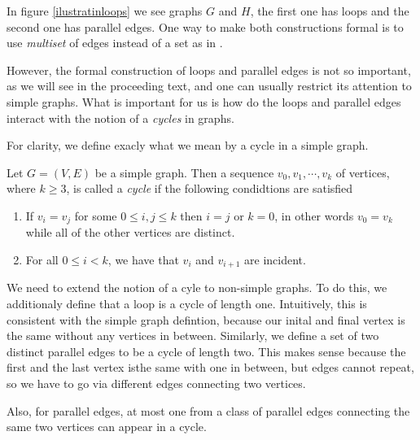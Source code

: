 In figure \ref{ilustratinloops} we see graphs $G$ and $H$, the first one has loops and the second one has parallel edges. One way to make both constructions formal is to use \textit{multiset} of edges instead of a set as in \cite[4]{oxley1}.

However, the formal construction of loops and parallel edges is not so important, as we will see in the proceeding text, and one can usually restrict its attention to simple graphs. What is important for us is how do the loops and parallel edges interact with the notion of a \textit{cycles} in graphs. 

For clarity, we define exacly what we mean by a cycle in a simple graph.

\begin{defn}
    Let $G = (V,E)$ be a simple graph. Then a sequence $v_0, v_1, \cdots, v_k$ of vertices, where $k\geq 3$, is called a \textit{cycle} if the following condidtions are satisfied
    
    \begin{enumerate}

        \item If $v_i = v_j$ for some $0 \leq i,j \leq k$ then $i = j$ or $k = 0$, in other words $v_0 = v_k$ while all of the other vertices are distinct. 
        
        \item For all $0\leq i < k$, we have that $v_i$ and $v_{i+1}$ are incident.
    \end{enumerate}
\end{defn}

We need to extend the notion of a cyle to non-simple graphs. To do this, we additionaly define that a loop is a cycle of length one. Intuitively, this is consistent with the simple graph defintion, because our inital and final vertex is the same without any vertices in between. Similarly, we define a set of two distinct parallel edges to be a cycle of length two. This makes sense because the first and the last vertex isthe same with one in between, but edges cannot repeat, so we have to go via different edges connecting two vertices.





Also, for parallel edges, at most one from a class of parallel edges connecting the same two vertices can appear in a cycle.


